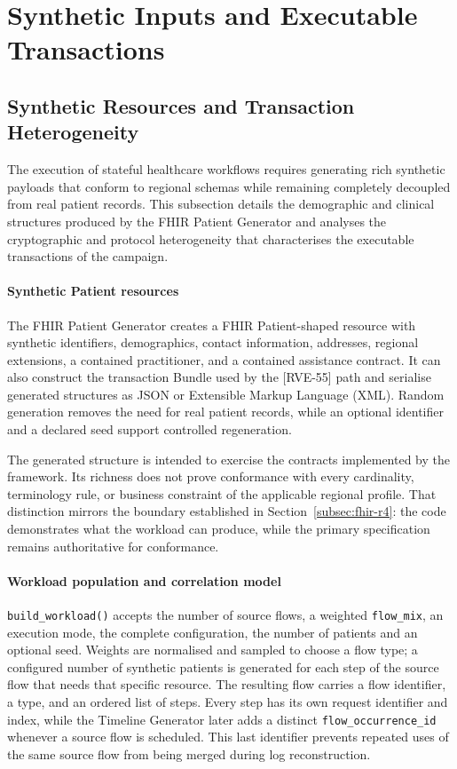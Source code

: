 \section{Synthetic Inputs and Executable Transactions}
\label{sec:rdg-data-workload-transactions}

\subsection{Synthetic Resources and Transaction Heterogeneity}
\label{subsec:rdg-resources-transactions}

\noindent The execution of stateful healthcare workflows requires generating rich
synthetic payloads that conform to regional schemas while remaining completely
decoupled from real patient records. This subsection details the demographic
and clinical structures produced by the FHIR Patient Generator and analyses the
cryptographic and protocol heterogeneity that characterises the executable
transactions of the campaign.

\paragraph{Synthetic Patient resources}
\noindent The FHIR Patient Generator creates a FHIR Patient-shaped resource with synthetic
identifiers, demographics, contact information, addresses, regional
extensions, a contained practitioner, and a contained assistance contract.
It can also construct the transaction Bundle used by the [RVE-55] path and
serialise generated structures as JSON or Extensible Markup Language (XML).
Random generation removes the
need for real patient records, while an optional identifier and a declared seed
support controlled regeneration.

\noindent The generated structure is intended to exercise the contracts implemented by
the framework. Its richness does not prove conformance with every cardinality,
terminology rule, or business constraint of the applicable regional profile.
That distinction mirrors the boundary established in
Section~\ref{subsec:fhir-r4}: the code demonstrates what the workload can
produce, while the primary specification remains authoritative for
conformance.

\paragraph{Workload population and correlation model}
\noindent \texttt{build\_workload()} accepts the number of source flows, a weighted
\texttt{flow\_mix}, an execution mode, the complete configuration, the number of patients and an
optional seed. Weights are normalised and sampled to choose a flow type; a configured number of
synthetic patients is generated for each step of the source flow that needs that specific resource. The resulting flow carries
a flow identifier, a type, and an ordered list of steps. Every step has its own
request identifier and index, while the Timeline Generator later adds a distinct
\texttt{flow\_occurrence\_id} whenever a source flow is scheduled. This last
identifier prevents repeated uses of the same source flow from being merged
during log reconstruction.

